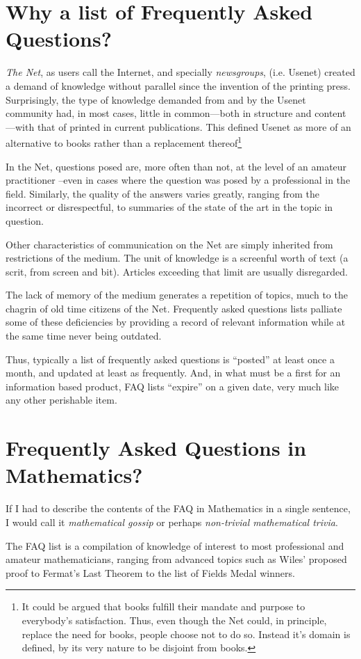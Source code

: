\section{Why a list of Frequently Asked Questions?}

\emph{The Net}, as users call the Internet, and specially
\emph{newsgroups}, (i.e. Usenet) created a demand of knowledge without
parallel since the invention of the printing press.  Surprisingly, the
type of knowledge demanded from and by the Usenet community had, in
most cases, little in common---both in structure and content---with
that of printed in current publications. This defined Usenet as more of an
alternative to books rather than a replacement thereof\footnote{It could be
argued that books fulfill their mandate and purpose to everybody's
satisfaction.  Thus, even though the Net could, in principle, replace
the need for books, people choose not to do so. Instead it's domain is
defined, by its very nature to be disjoint from books.}

In the Net, questions posed are, more often than not, at the level 
of an amateur practitioner --even in cases where the question
was posed by a professional in the field. Similarly, the quality of the
answers  varies greatly, ranging from the incorrect or disrespectful,
to summaries of the state of the art in the topic in question.

Other characteristics of communication on the Net are simply inherited
from restrictions of the medium. The unit of knowledge is a screenful
worth of text (a scrit, from screen and bit). Articles exceeding that
limit are usually disregarded.

The lack of memory of the medium generates a repetition of topics,
much to the chagrin of old time citizens of the Net. 
Frequently asked questions lists palliate some of these deficiencies by
providing a record of relevant information while at the same time 
never being outdated. 

Thus, typically a list of frequently asked questions is ``posted''
at least once a month, and updated at least as frequently. And,
in what must be a first for an information based product, FAQ lists 
``expire'' on a given date, very much like any other  perishable item.


\section{Frequently Asked Questions in Mathematics?}

If I had to describe the contents of the FAQ in Mathematics
in a single sentence, I would call it \emph{mathematical gossip}
or perhaps \emph{non-trivial mathematical trivia}.

The FAQ list is a compilation of knowledge of interest to most
professional and amateur mathematicians, ranging from advanced
topics such as Wiles' proposed proof to Fermat's Last Theorem
to the list of Fields Medal winners.
